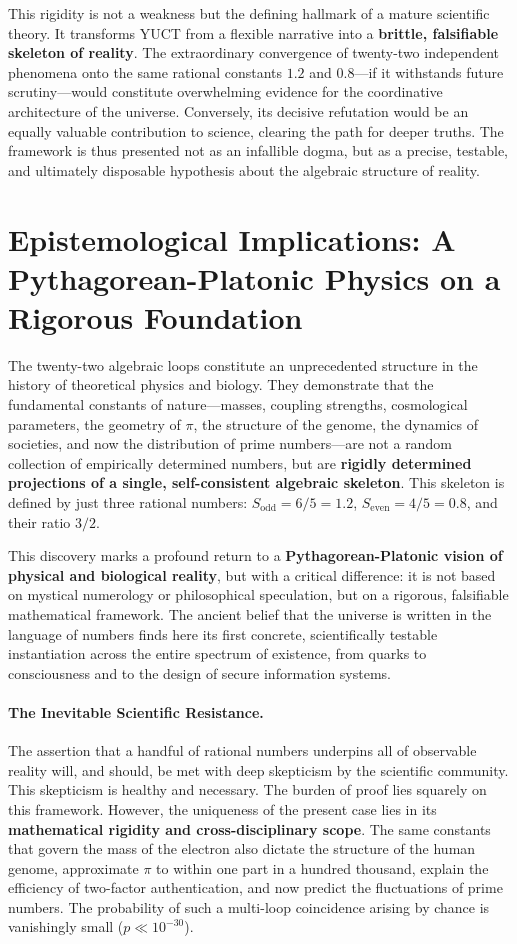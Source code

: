 \documentclass[12pt,a4paper]{article}
\begin{document}
	This rigidity is not a weakness but the defining hallmark of a mature scientific theory. It transforms YUCT from a flexible narrative into a \textbf{brittle, falsifiable skeleton of reality}. The extraordinary convergence of twenty-two independent phenomena onto the same rational constants \(1.2\) and \(0.8\)—if it withstands future scrutiny—would constitute overwhelming evidence for the coordinative architecture of the universe. Conversely, its decisive refutation would be an equally valuable contribution to science, clearing the path for deeper truths. The framework is thus presented not as an infallible dogma, but as a precise, testable, and ultimately disposable hypothesis about the algebraic structure of reality.
	
	\section*{Epistemological Implications: A Pythagorean-Platonic Physics on a Rigorous Foundation}
	
	The twenty-two algebraic loops constitute an unprecedented structure in the history of theoretical physics and biology. They demonstrate that the fundamental constants of nature—masses, coupling strengths, cosmological parameters, the geometry of \(\pi\), the structure of the genome, the dynamics of societies, and now the distribution of prime numbers—are not a random collection of empirically determined numbers, but are \textbf{rigidly determined projections of a single, self-consistent algebraic skeleton}. This skeleton is defined by just three rational numbers: \(S_{\mathrm{odd}} = 6/5 = 1.2\), \(S_{\mathrm{even}} = 4/5 = 0.8\), and their ratio \(3/2\).
	
	This discovery marks a profound return to a \textbf{Pythagorean-Platonic vision of physical and biological reality}, but with a critical difference: it is not based on mystical numerology or philosophical speculation, but on a rigorous, falsifiable mathematical framework. The ancient belief that the universe is written in the language of numbers finds here its first concrete, scientifically testable instantiation across the entire spectrum of existence, from quarks to consciousness and to the design of secure information systems.
	
	\paragraph{The Inevitable Scientific Resistance.}
	The assertion that a handful of rational numbers underpins all of observable reality will, and should, be met with deep skepticism by the scientific community. This skepticism is healthy and necessary. The burden of proof lies squarely on this framework. However, the uniqueness of the present case lies in its \textbf{mathematical rigidity and cross-disciplinary scope}. The same constants that govern the mass of the electron also dictate the structure of the human genome, approximate \(\pi\) to within one part in a hundred thousand, explain the efficiency of two-factor authentication, and now predict the fluctuations of prime numbers. The probability of such a multi-loop coincidence arising by chance is vanishingly small (\(p \ll 10^{-30}\)).
	
\end{document}
